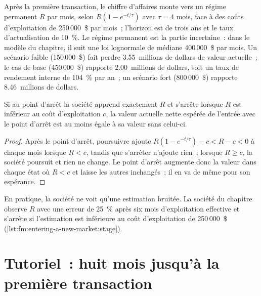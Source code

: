 Après la première transaction, le chiffre d'affaires monte vers un régime permanent $R$ par mois, selon $R(1-e^{-t/\tau})$ avec $\tau=4$ mois, face à des coûts d'exploitation de
250\,000~\$ par mois~; l'horizon est de trois ans et le taux d'actualisation de 10~\%. Le régime permanent est la partie incertaine~: dans le modèle du chapitre, il suit
une loi lognormale de médiane 400\,000~\$ par mois. Un scénario faible (150\,000~\$) fait perdre 3.55~millions de dollars de valeur actuelle~; le cas de base (450\,000~\$) rapporte
2.00~millions de dollars, soit un taux de rendement interne de 104~\% par an~; un scénario fort (800\,000~\$) rapporte 8.46~millions de dollars.

\begin{proposition}\label{prop:fm:entering-a-new-market:kill}
Si au point d'arrêt la société apprend exactement $R$ et s'arrête lorsque $R$ est inférieur au coût d'exploitation $c$, la valeur actuelle nette espérée de l'entrée avec le
point d'arrêt est au moins égale à sa valeur sans celui-ci.
\end{proposition}

\begin{proof}
Après le point d'arrêt, poursuivre ajoute $R(1-e^{-t/\tau})-c<R-c<0$ à chaque mois lorsque $R<c$, tandis que s'arrêter n'ajoute rien~; lorsque $R\ge c$, la société poursuit et
rien ne change. Le point d'arrêt augmente donc la valeur dans chaque état où $R<c$ et laisse les autres inchangés~; il en va de même pour son espérance.
\end{proof}

En pratique, la société ne voit qu'une estimation bruitée. La société du chapitre observe $R$ avec une erreur de 25~\% après six mois d'exploitation effective et s'arrête si
l'estimation est inférieure au coût d'exploitation de 250\,000~\$ (\cref{lst:fm:entering-a-new-market:stage}).

\label{lst:fm:entering-a-new-market:stage}

\section{Tutoriel~: huit mois jusqu'à la première transaction}\label{tut:fm:entering-a-new-market:tut}

